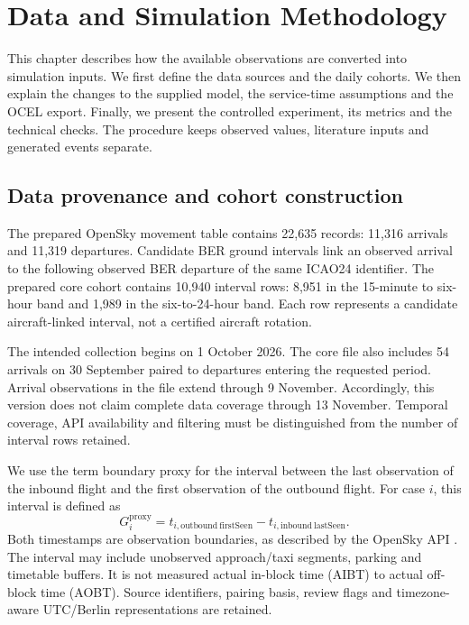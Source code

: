 \chapter{Data and Simulation Methodology}
\label{ch:methods}

This chapter describes how the available observations are converted into simulation inputs. We first define the data sources and the daily cohorts. We then explain the changes to the supplied model, the service-time assumptions and the OCEL export. Finally, we present the controlled experiment, its metrics and the technical checks. The procedure keeps observed values, literature inputs and generated events separate.

\section{Data provenance and cohort construction}
The prepared OpenSky movement table contains 22,635 records: 11,316 arrivals and 11,319 departures. Candidate BER ground intervals link an observed arrival to the following observed BER departure of the same ICAO24 identifier. The prepared core cohort contains 10,940 interval rows: 8,951 in the 15-minute to six-hour band and 1,989 in the six-to-24-hour band. Each row represents a candidate aircraft-linked interval, not a certified aircraft rotation.

The intended collection begins on 1 October 2026. The core file also includes 54 arrivals on 30 September paired to departures entering the requested period. Arrival observations in the file extend through 9 November. Accordingly, this version does not claim complete data coverage through 13 November. Temporal coverage, API availability and filtering must be distinguished from the number of interval rows retained.

We use the term boundary proxy for the interval between the last observation of the inbound flight and the first observation of the outbound flight. For case $i$, this interval is defined as
\begin{equation}
G_i^{\mathrm{proxy}}=t_{i,\mathrm{outbound\ firstSeen}}-t_{i,\mathrm{inbound\ lastSeen}}.
\end{equation}
Both timestamps are observation boundaries, as described by the OpenSky API \cite{opensky_rest}. The interval may include unobserved approach/taxi segments, parking and timetable buffers. It is not measured actual in-block time (AIBT) to actual off-block time (AOBT). Source identifiers, pairing basis, review flags and timezone-aware UTC/Berlin representations are retained.

